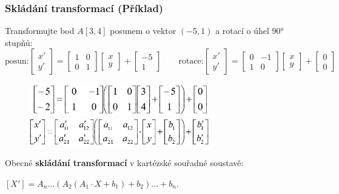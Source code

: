 \subsubsection*{Skládání transformací (Příklad)}
Transformujte bod $A[3,4]$ posunem o vektor $(-5,1)$ a rotací o úhel $\ang{90}$ stupňů:
	\begin{equation*}
\textrm{posun:}
 \begin{bmatrix}     
 x'   \\[0.3em]      
 y'
 \end{bmatrix} = 
 \begin{bmatrix}
     1 & 0     \\[0.3em]
     0 & 1        
  \end{bmatrix}
  \begin{bmatrix}
     x     \\[0.3em]
     y        
     \end{bmatrix} +
      \begin{bmatrix}
     -5     \\[0.3em]
     1        
     \end{bmatrix} \qquad \textrm{rotace:}
	 \begin{bmatrix}     
	 x'   \\[0.3em]      
	 y'
	 \end{bmatrix} = 
	 \begin{bmatrix}
	     0 & -1     \\[0.3em]
	     1 & 0        
	  \end{bmatrix}
	  \begin{bmatrix}
	     x     \\[0.3em]
	     y        
	     \end{bmatrix} +
	      \begin{bmatrix}
	     0     \\[0.3em]
	     0        
	     \end{bmatrix}
\end{equation*}
\begin{figure}[H]
\centering
\includegraphics[width=0.7\textwidth]{assets/2_skladani}
\includegraphics[width=0.7\textwidth]{assets/2_skladani2}
\end{figure}
\noindent Obecné \textbf{skládání transformací} v kartézské souřadné soustavě:
\begin{center}
$[X'] = A_n ...(A_2(A_1 \cdot X + b_1) + b_2) ... + b_n$.
\end{center}


